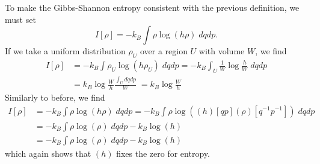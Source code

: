 To make the Gibbs-Shannon entropy consistent with the previous definition, we must set
\begin{equation}
	I[\rho] = - k_B \int \rho \log ( h \rho ) \; dq dp.
\end{equation}
If we take a uniform distribution $\rho_U$ over a region $U$ with volume $W$, we find
\begin{equation}
	\begin{aligned}
		I[\rho] &= - k_B \int \rho_U \log ( h \rho_U ) \; dq dp = - k_B \int_{U} \frac{1}{W} \log \frac{h}{W} \; dq dp \\
		&= k_B \log \frac{W}{h} \frac{ \int_{U} dq dp}{W} \;  = k_B \log \frac{W}{h}
	\end{aligned}
\end{equation}
Similarly to before, we find
\begin{equation}
	\begin{aligned}
	I[\rho] &= - k_B \int \rho \log (h \rho) \; dq dp = - k_B \int \rho \log \left( (h)[qp](\rho)[q^{-1}p^{-1}] \right) \; dq dp  \\
	&= - k_B \int \rho \log (\rho) \; dq dp - k_B \log (h) \\
	&= - k_B \int \rho \log (\rho) \; dq dp - k_B \log (h)
	\end{aligned}
\end{equation}
which again shows that $(h)$ fixes the zero for entropy.

